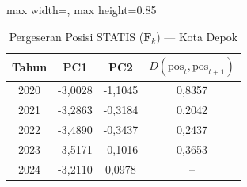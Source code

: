 \begin{table}[H]
\centering
\caption{Pergeseran Posisi STATIS ($\mathbf{F}_k$) --- Kota Depok} \label{tab:app2jarak_statis_skor_kota_depok}
\begin{adjustbox}{max width=\textwidth, max height=0.85\textheight}
\begin{tabular}{|c|c|c|c|}
\hline
\textbf{Tahun} & \textbf{PC1} & \textbf{PC2} & \textbf{$D(\text{pos}_t, \text{pos}_{t+1})$} \\
\hline
2020 & -3,0028 & -1,1045 & 0,8357 \\
2021 & -3,2863 & -0,3184 & 0,2042 \\
2022 & -3,4890 & -0,3437 & 0,2437 \\
2023 & -3,5171 & -0,1016 & 0,3653 \\
2024 & -3,2110 & 0,0978 & -- \\
\hline
\end{tabular}
\end{adjustbox}
\end{table}
